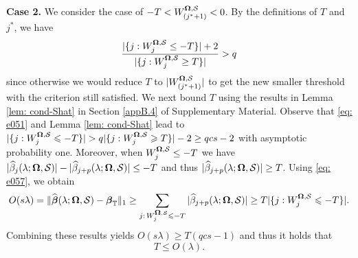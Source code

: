 \documentclass[11pt]{article}
\newcommand{\bbeta}{\mbox{\boldmath $\beta$}}
\newcommand{\bOmg}{\mbox{\boldmath $\Omega$}}
\newcommand{\sbOmg}{\mbox{\scriptsize\boldmath $\Omega$}}
\begin{document}
\textbf{Case 2.} We consider the case of $-T<W_{(j^*+1)}^{\sbOmg, \mathcal S} < 0$. By the definitions of $T$ and $j^*$, we have
\begin{align}\label{eq: e051}
\frac{|\{j: W_j^{\sbOmg, \mathcal S} \leq -T\}| + 2}{|\{j: W_j^{\sbOmg, \mathcal S} \geq T\}|} > q
\end{align}
since otherwise we would reduce $T$ to $|W_{(j^*+1)}^{\sbOmg, \mathcal S}|$ to get the new smaller threshold with the criterion still satisfied.
We next bound $T$ using the results in Lemma \ref{lem: cond-Shat} in Section \ref{appB.4} of Supplementary Material. Observe that \eqref{eq: e051} and Lemma \ref{lem: cond-Shat} lead to
$ |\{j : W_j^{\sbOmg,  \mathcal S}\leqslant - T\} | >
q |\{j : W_j^{\sbOmg,  \mathcal S}\geqslant T\} | -2 \geq
q c s -2$
with asymptotic probability one. Moreover, when $W_{j}^{\sbOmg, \mathcal S} \leq - T$ we have $|\widehat{\beta}_{j}(\lambda;\bOmg, \mathcal S)| - |\widehat{\beta}_{j + p}(\lambda; \bOmg, \mathcal S)| \leq - T $ and thus  $|\widehat{\beta}_{j+p}(\lambda; \bOmg, \mathcal S)| \geq T $.
Using \eqref{eq: e057}, we obtain
\begin{align*}
O(s\lambda)  =
\|\widehat{\bbeta}(\lambda; \bOmg, \mathcal S)-\bbeta_{\mathbb{T}}\|_1
\geq \sum _{j :\, W_j^{\sbOmg, \mathcal S}\leqslant - T} | \widehat{\beta}_{j+p}(\lambda; \bOmg, \mathcal S) |
\geq T |\{j : W_j^{\sbOmg, \mathcal S}\leqslant - T\}| .
\end{align*}
Combining these results yields
$O(s\lambda) \geq T (q c s-1)$ and thus it holds that
\begin{equation}
T \leq O(\lambda).
\end{equation}
\end{document}
